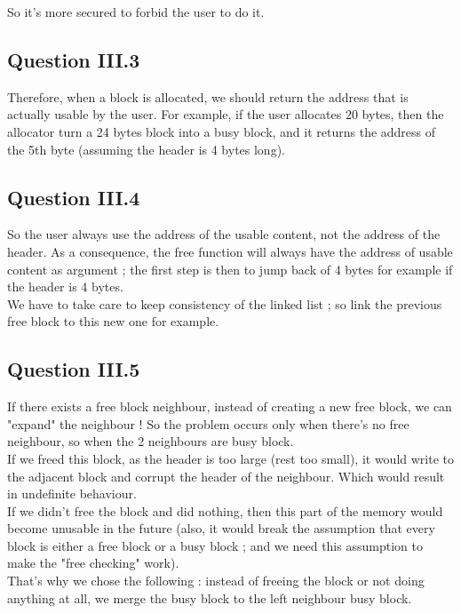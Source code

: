 \documentclass[twoside]{article}
\begin{document}
So it's more secured to forbid the user to do it.

\subsection{Question III.3}
Therefore, when a block is allocated, we should return the address that is
actually usable by the user. For example, if the user allocates 20 bytes, then
the allocator turn a 24 bytes block into a busy block, and it returns the
address of the 5th byte (assuming the header is 4 bytes long).

\subsection{Question III.4}
So the user always use the address of the usable content, not the address of
the header. As a consequence, the free function will always have the address
of usable content as argument ; the first step is then to jump back of 4
bytes for example if the header is 4 bytes.\\

We have to take care to keep consistency of the linked list ; so link the
previous free block to this new one for example.

\subsection{Question III.5}
If there exists a free block neighbour, instead of creating a new free
block, we can "expand" the neighbour ! So the problem occurs only when there's
no free neighbour, so when the 2 neighbours are busy block.\\

If we freed this block, as the header is too large (rest too small), it would
write to the adjacent block and corrupt the header of the neighbour. Which
would result in undefinite behaviour.\\

If we didn't free the block and did nothing, then this part of the memory would
become unusable in the future (also, it would break the assumption that every
block is either a free block or a busy block ; and we need this assumption to
make the "free checking" work).\\

That's why we chose the following : instead of freeing the block or not doing
anything at all, we merge the busy block to the left neighbour busy block.
\end{document}
